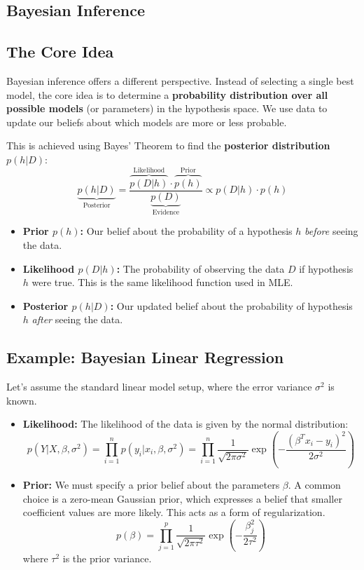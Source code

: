 \documentclass{article}
\begin{document}
\begin{multicols}{2}
\section{Bayesian Inference}
\subsection{The Core Idea}
Bayesian inference offers a different perspective. Instead of selecting a single best model, the core idea is to determine a \textbf{probability distribution over all possible models} (or parameters) in the hypothesis space. We use data to update our beliefs about which models are more or less probable.

This is achieved using Bayes' Theorem to find the \textbf{posterior distribution} $p(h|D)$:
$$ \underbrace{p(h|D)}_{\text{Posterior}} = \frac{\overbrace{p(D|h)}^{\text{Likelihood}} \cdot \overbrace{p(h)}^{\text{Prior}}}{\underbrace{p(D)}_{\text{Evidence}}} \propto p(D|h) \cdot p(h) $$
\begin{itemize}
    \item \textbf{Prior $p(h)$:} Our belief about the probability of a hypothesis $h$ \textit{before} seeing the data.
    \item \textbf{Likelihood $p(D|h)$:} The probability of observing the data $D$ if hypothesis $h$ were true. This is the same likelihood function used in MLE.
    \item \textbf{Posterior $p(h|D)$:} Our updated belief about the probability of hypothesis $h$ \textit{after} seeing the data.
\end{itemize}

\subsection{Example: Bayesian Linear Regression}
Let's assume the standard linear model setup, where the error variance $\sigma^2$ is known.
\begin{itemize}
    \item \textbf{Likelihood:} The likelihood of the data is given by the normal distribution:
    $$ p(Y|X, \beta, \sigma^2) = \prod_{i=1}^{n} p(y_i|x_i, \beta, \sigma^2) = \prod_{i=1}^{n} \frac{1}{\sqrt{2\pi\sigma^2}} \exp\left(-\frac{(\beta^T x_i - y_i)^2}{2\sigma^2}\right) $$
    \item \textbf{Prior:} We must specify a prior belief about the parameters $\beta$. A common choice is a zero-mean Gaussian prior, which expresses a belief that smaller coefficient values are more likely. This acts as a form of regularization.
    $$ p(\beta) = \prod_{j=1}^{p} \frac{1}{\sqrt{2\pi\tau^2}} \exp\left(-\frac{\beta_j^2}{2\tau^2}\right) $$
    where $\tau^2$ is the prior variance.
\end{itemize}


\end{multicols}
\end{document}
